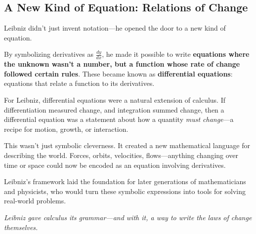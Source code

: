 \subsection{A New Kind of Equation: Relations of Change}

Leibniz didn’t just invent notation—he opened the door to a new kind of equation.

By symbolizing derivatives as \( \frac{dy}{dx} \), he made it possible to write \textbf{equations where the unknown wasn’t a number, but a function whose rate of change followed certain rules}. These became known as \textbf{differential equations}: equations that relate a function to its derivatives.

For Leibniz, differential equations were a natural extension of calculus. If differentiation measured change, and integration summed change, then a differential equation was a statement about how a quantity \emph{must change}—a recipe for motion, growth, or interaction.

This wasn’t just symbolic cleverness. It created a new mathematical language for describing the world. Forces, orbits, velocities, flows—anything changing over time or space could now be encoded as an equation involving derivatives.

Leibniz’s framework laid the foundation for later generations of mathematicians and physicists, who would turn these symbolic expressions into tools for solving real-world problems.

\vspace{1em}

\begin{center}
\textit{Leibniz gave calculus its grammar—and with it, a way to write the laws of change themselves.}
\end{center}
